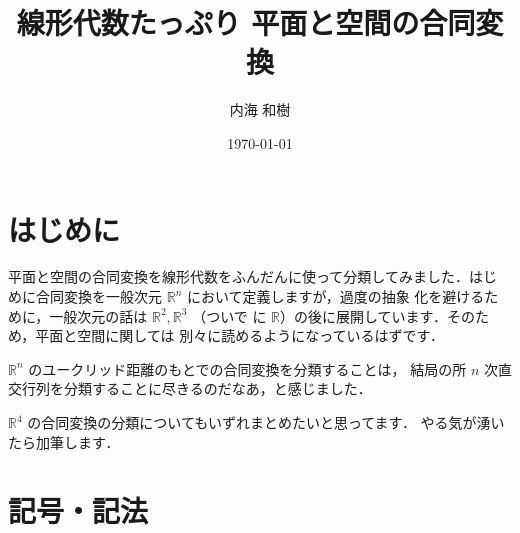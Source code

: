 \documentclass[11pt, uplatex, dvipdfmx, titlepage]{jsarticle}
\theoremstyle{definition}
\begin{document}
\title{線形代数たっぷり 平面と空間の合同変換}
\author{内海 和樹}
\date{\today}
\maketitle
  


\section*{はじめに}

 平面と空間の合同変換を線形代数をふんだんに使って分類してみました．はじ
 めに合同変換を一般次元 $\mathbb{R}^n$ において定義しますが，過度の抽象
 化を避けるために，一般次元の話は $\mathbb{R}^2, \mathbb{R}^3$ （ついで
 に $\mathbb{R}$）の後に展開しています．そのため，平面と空間に関しては
 別々に読めるようになっているはずです．

 $\mathbb{R}^n$ のユークリッド距離のもとでの合同変換を分類することは，
 結局の所 $n$ 次直交行列を分類することに尽きるのだなあ，と感じました．

 $\mathbb{R}^4$ の合同変換の分類についてもいずれまとめたいと思ってます．
 やる気が湧いたら加筆します．
 
 \newpage

 \section*{記号・記法}
\end{document}

